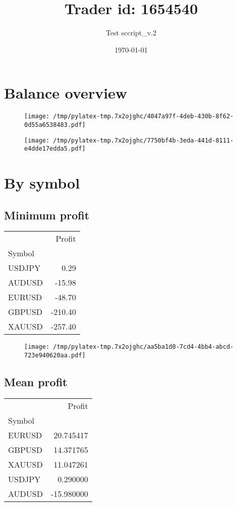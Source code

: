 \documentclass{article}%
\title{Trader id: 1654540}%
\author{Test sccript\_v.2}%
\date{\today}%
\begin{document}
%
\normalsize%
\maketitle%
\section{Balance overview}%
\label{sec:Balanceoverview}%


\begin{figure}[htbp]%
\centering%
\texttt{[image: /tmp/pylatex-tmp.7x2ojghc/4047a97f-4deb-430b-8f62-0d55a6538483.pdf]}%
\end{figure}

%


\begin{figure}[htbp]%
\centering%
\texttt{[image: /tmp/pylatex-tmp.7x2ojghc/7750bf4b-3eda-441d-8111-e4dde17edda5.pdf]}%
\end{figure}

%
\section{By symbol}%
\label{sec:Bysymbol}%
\subsection{Minimum profit }%
\label{subsec:Minimumprofit}%
\begin{tabular}{lr}
\toprule
{} &  Profit \\
Symbol &         \\
\midrule
USDJPY &    0.29 \\
AUDUSD &  -15.98 \\
EURUSD &  -48.70 \\
GBPUSD & -210.40 \\
XAUUSD & -257.40 \\
\bottomrule
\end{tabular}
%


\begin{figure}[htbp]%
\centering%
\texttt{[image: /tmp/pylatex-tmp.7x2ojghc/aa5ba1d0-7cd4-4bb4-abcd-723e940620aa.pdf]}%
\end{figure}

%
\newpage %
\subsection{Mean profit }%
\label{subsec:Meanprofit}%
\begin{tabular}{lr}
\toprule
{} &     Profit \\
Symbol &            \\
\midrule
EURUSD &  20.745417 \\
GBPUSD &  14.371765 \\
XAUUSD &  11.047261 \\
USDJPY &   0.290000 \\
AUDUSD & -15.980000 \\
\bottomrule
\end{tabular}
%
\end{document}
